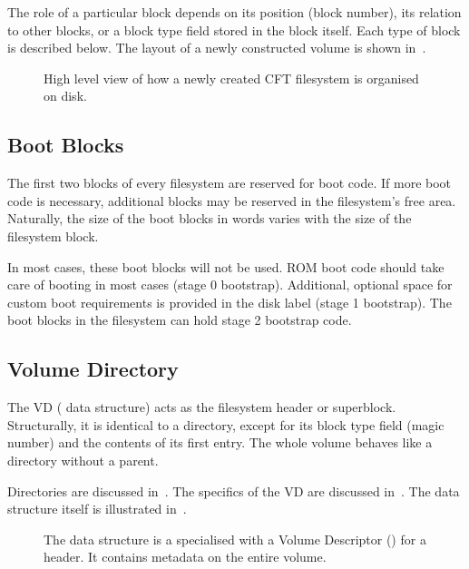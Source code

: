 The role of a particular block depends on its position (block number), its
relation to other blocks, or a block type field stored in the block
itself. Each type of block is described below. The layout of a newly
constructed volume is shown in~.

\begin{figure}
 \centering
 
 \caption[CFT filesystem overview]{\label{fig:filesystem-structure} High level
   view of how a newly created CFT filesystem is organised on disk.}
\end{figure}



\subsection{Boot Blocks}

The first two blocks of every filesystem are reserved for boot code. If more
boot code is necessary, additional blocks may be reserved in the filesystem's
free area. Naturally, the size of the boot blocks in words varies with the size
of the filesystem block.

In most cases, these boot blocks will not be used. ROM boot code should take
care of booting in most cases (stage 0 bootstrap). Additional, optional space
for custom boot requirements is provided in the disk label (stage 1
bootstrap). The boot blocks in the filesystem can hold stage 2 bootstrap
code.



\subsection{Volume Directory}

The \gls{VD} ( data structure) acts as the filesystem header or
superblock. Structurally, it is identical to a directory, except for its block
type field (magic number) and the contents of its first entry. The whole volume
behaves like a directory without a parent.

Directories are discussed in~. The specifics of the
\gls{VD} are discussed in~. The data structure itself is
illustrated in~.




\begin{figure}
 \centering
 
 \caption[CFT Volume data structure]{\label{fig:fs-volumedir} The
    data structure is a specialised  with a
   Volume Descriptor () for a header. It contains
   metadata on the entire volume.}
\end{figure}



